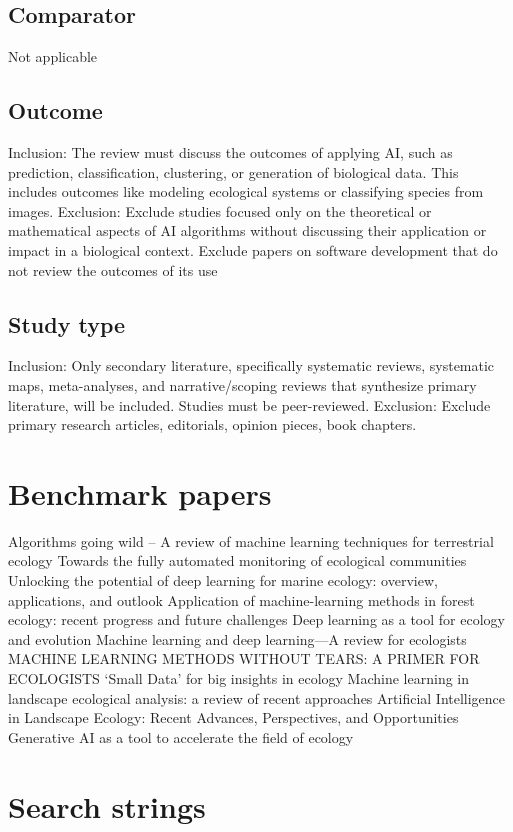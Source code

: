 \documentclass{article}
\begin{document}
\subsection{Comparator}
Not applicable

\subsection{Outcome}
Inclusion: The review must discuss the outcomes of applying AI, such as prediction, classification, clustering, or generation of biological data. This includes outcomes like modeling ecological systems or classifying species from images.
Exclusion: Exclude studies focused only on the theoretical or mathematical aspects of AI algorithms without discussing their application or impact in a biological context. Exclude papers on software development that do not review the outcomes of its use

\subsection{Study type}
Inclusion: Only secondary literature, specifically systematic reviews, systematic maps, meta-analyses, and narrative/scoping reviews that synthesize primary literature, will be included. Studies must be peer-reviewed.
Exclusion: Exclude primary research articles, editorials, opinion pieces, book chapters.

\section{Benchmark papers}
Algorithms going wild – A review of machine learning techniques for terrestrial ecology
Towards the fully automated monitoring of ecological communities
Unlocking the potential of deep learning for marine ecology: overview, applications, and outlook
Application of machine-learning methods in forest ecology: recent progress and future challenges
Deep learning as a tool for ecology and evolution
Machine learning and deep learning—A review for ecologists
MACHINE LEARNING METHODS WITHOUT TEARS: A PRIMER FOR ECOLOGISTS
‘Small Data’ for big insights in ecology
Machine learning in landscape ecological analysis: a review of recent approaches
Artificial Intelligence in Landscape Ecology: Recent Advances, Perspectives, and Opportunities
Generative AI as a tool to accelerate the field of ecology

\section{Search strings}
\end{document}
